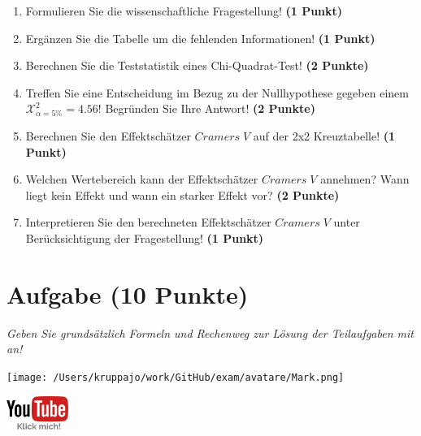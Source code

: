 \documentclass[a4paper, 9pt]{scrartcl}\usepackage[]{graphicx}\usepackage[]{xcolor}
\begin{document}
\begin{enumerate}
\item Formulieren Sie die wissenschaftliche Fragestellung! \textbf{(1 Punkt)}
\item Ergänzen Sie die Tabelle um die fehlenden Informationen! \textbf{(1 Punkt)} 
\item Berechnen Sie die Teststatistik eines Chi-Quadrat-Test! \textbf{(2 Punkte)}
\item Treffen Sie eine Entscheidung im Bezug zu der Nullhypothese gegeben
  einem $\mathcal{X}^2_{\alpha = 5\%} = 4.56$! Begründen Sie Ihre Antwort!
  \textbf{(2 Punkte)}
\item Berechnen Sie den Effektschätzer $Cramers\; V$ auf der 2x2 Kreuztabelle! \textbf{(1 Punkt)}
\item Welchen Wertebereich kann der Effektschätzer $Cramers\; V$ annehmen? Wann liegt kein Effekt und wann ein starker Effekt vor? \textbf{(2 Punkte)}
\item Interpretieren Sie den berechneten Effektschätzer $Cramers\; V$ unter Berücksichtigung der Fragestellung! \textbf{(1 Punkt)}
\end{enumerate} 
\clearpage

\section{Aufgabe \hfill (10 Punkte)}

\textit{Geben Sie grundsätzlich Formeln und Rechenweg zur Lösung der Teilaufgaben mit an!} \\[1Ex]
 

 
\begin{minipage}[t]{0.5\textwidth}
\texttt{[image: /Users/kruppajo/work/GitHub/exam/avatare/Mark.png]}
\end{minipage}
\begin{minipage}[t]{0.5\textwidth}
\hfill
\href{https://youtu.be/jakM7fHyZfU}{\includegraphics[width = 2cm]{img/youtube}}
\end{minipage}
\vspace{-3Ex}
\end{document}

